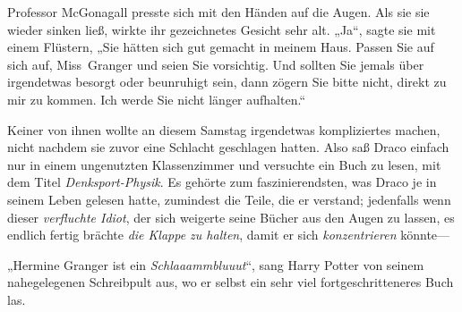 Professor McGonagall presste sich mit den Händen auf die Augen. Als sie sie wieder sinken ließ, wirkte ihr gezeichnetes Gesicht sehr alt. „Ja“, sagte sie mit einem Flüstern, „Sie hätten sich gut gemacht in meinem Haus. Passen Sie auf sich auf, Miss~Granger und seien Sie vorsichtig. Und sollten Sie jemals über irgendetwas besorgt oder beunruhigt sein, dann zögern Sie bitte nicht, direkt zu mir zu kommen. Ich werde Sie nicht länger aufhalten.“


Keiner von ihnen wollte an diesem Samstag irgendetwas kompliziertes machen, nicht nachdem sie zuvor eine Schlacht geschlagen hatten. Also saß Draco einfach nur in einem ungenutzten Klassenzimmer und versuchte ein Buch zu lesen, mit dem Titel \emph{Denksport-Physik}.%
Es gehörte zum faszinierendsten, was Draco je in seinem Leben gelesen hatte, zumindest die Teile, die er verstand; jedenfalls wenn dieser \emph{verfluchte Idiot}, der sich weigerte seine Bücher aus den Augen zu lassen, es endlich fertig brächte \emph{die Klappe zu halten}, damit er sich \emph{konzentrieren} könnte—

„Hermine Granger ist ein \emph{Schlaaammbluuut}“, sang Harry Potter von seinem nahegelegenen Schreibpult aus, wo er selbst ein sehr viel fortgeschritteneres Buch las.

